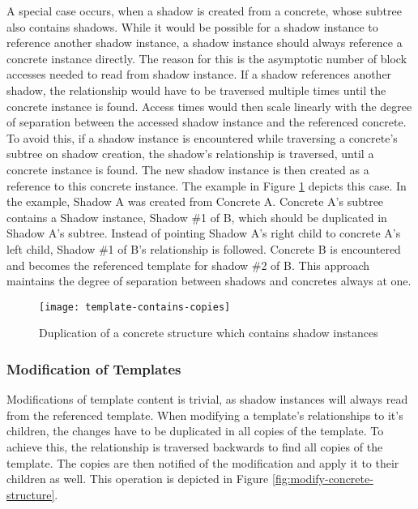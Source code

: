         A special case occurs, when a shadow is created from
        a concrete, whose subtree also contains shadows.
        While it would be possible for a shadow instance to reference another
        shadow instance, a shadow instance should always reference a concrete
        instance directly. The reason for this is the asymptotic number
        of block accesses needed to read from shadow instance. If a shadow references
        another shadow, the  relationship would
        have to be traversed multiple times until the concrete instance
        is found. Access times would then scale linearly with
        the degree of separation between the accessed shadow instance
        and the referenced concrete. To avoid this, if a shadow
        instance is encountered while traversing a concrete's
        subtree on shadow creation, the shadow's 
        relationship is traversed, until a concrete instance is found.
        The new shadow instance is then created as a reference to this
        concrete instance. The example in Figure \ref{fig:template-contains-copies}
        depicts this case. In the example, Shadow A was created from
        Concrete A. Concrete A's subtree contains a Shadow instance,
        Shadow \#1 of B, which should be duplicated in Shadow A's subtree.
        Instead of pointing Shadow A's right child to concrete A's left child,
        Shadow \#1 of B's  relationship is followed.
        Concrete B is encountered
        and becomes the referenced template for shadow \#2 of B.
        This approach maintains the degree of separation between shadows
        and concretes always at one.

        \begin{figure}[H]
            \centering
            \texttt{[image: template-contains-copies]}
            \caption{Duplication of a concrete structure which contains shadow instances}
            \label{fig:template-contains-copies}
        \end{figure}

    \subsubsection{Modification of Templates}
        Modifications of template content is trivial, as shadow instances
        will always read from the referenced template.
        When modifying a template's relationships to it's children,
        the changes have to be duplicated in all copies of the template.
        To achieve this, the  relationship is
        traversed backwards to find all copies of the template. The
        copies are then notified of the modification and apply
        it to their children as well. This operation is
        depicted in Figure \ref{fig:modify-concrete-structure}.

